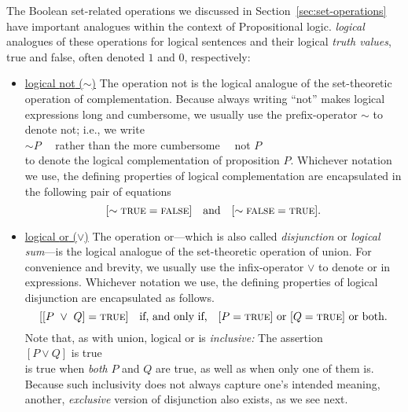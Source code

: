 %
The Boolean set-related operations we discussed in
Section~\ref{sec:set-operations} have important
analogues within the context of Propositional logic.
 {\em logical} analogues of these operations for logical
sentences and their logical {\em truth values},
%
{\sc true} and {\sc false}, often denoted $1$ and $0$, respectively:
\begin{itemize}
\item
\underline{logical {\small\sf not} ($\sim$)}
The operation {\small\sf not} is the logical analogue of the
set-theoretic operation of complementation.  Because always writing
``{\small\sf not}'' makes logical expressions long and cumbersome, we
usually use the prefix-operator $\sim$ to denote {\small\sf not};
i.e., we write \\
\hspace*{.35in}$\sim P$ \ \ rather than the more cumbersome
\ \ {\small\sf not} $P$ \\
to denote the logical complementation of proposition $P$.  Whichever
notation we use, the defining properties of logical complementation
are encapsulated in the following pair of equations
\[
[\sim \mbox{\sc true} = \mbox{\sc false}] \ \ \mbox{ and } \ \ [\sim
  \mbox{\sc false} = \mbox{\sc true}].
\]

\item
\underline{logical {\small\sf or} ($\vee$)}
%
The operation {\small\sf or}---which is also called {\em disjunction}
or {\em logical sum}---is the logical analogue of the set-theoretic
operation of union.  For convenience and brevity, we usually use the
infix-operator $\vee$ to denote {\small\sf or} in expressions.
Whichever notation we use, the defining properties of logical
disjunction are encapsulated as follows.
\[
[[P \ \vee \ Q] =  \mbox{\sc true}] \ \ \mbox{ if, and only if, } \ \ 
[P = \mbox{\sc true}] \mbox{ or }
[Q = \mbox{\sc true}] \mbox{ or both}.
\]
Note that, as with union, logical {\small\sf or} is {\em inclusive:}
The assertion \\
\hspace*{.35in}$[P \vee Q]$ is \mbox{\sc true} \\
%
is true when {\em both} $P$ and $Q$ are true, as well as when only one
of them is.  Because such inclusivity does not always capture one's
intended meaning, another, {\em exclusive} version of disjunction also
exists, as we see next.


\end{itemize}
